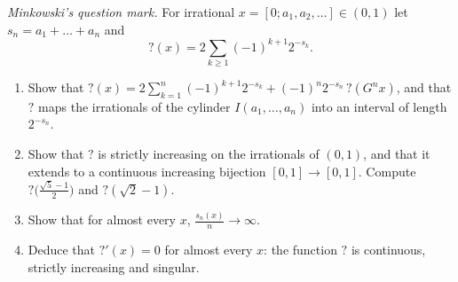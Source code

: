 
\begin{exercise}[$\star\star\star$]\label{pb:minkowski}
\emph{Minkowski's question mark.} For irrational $x=[0;a_1,a_2,\dots]\in(0,1)$ let $s_n=a_1+\dots+a_n$ and
\[
?(x)=2\sum_{k\ge1}(-1)^{k+1}2^{-s_k}.
\]
\begin{enumerate}[label=(\alph*)]
\item Show that $?(x)=2\sum_{k=1}^n(-1)^{k+1}2^{-s_k}+(-1)^n2^{-s_n}\,?(G^nx)$, and that $?$ maps the irrationals of the cylinder
$I(a_1,\dots,a_n)$ into an interval of length $2^{-s_n}$.
\item Show that $?$ is strictly increasing on the irrationals of $(0,1)$, and that it extends to a continuous increasing bijection
$[0,1]\to[0,1]$. Compute $?\bigl(\frac{\sqrt5-1}2\bigr)$ and $?(\sqrt2-1)$.
\item Show that for almost every $x$, $\frac{s_n(x)}n\to\infty$.
\item Deduce that $?'(x)=0$ for almost every $x$: the function $?$ is continuous, strictly increasing and singular.
\end{enumerate}
\end{exercise}

